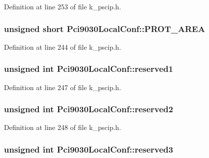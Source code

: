 Definition at line 253 of file k\_\-pscip.h.\hypertarget{struct_pci9030_local_conf_86e45b8c8a309f0710433c9752c94392}{
\subsubsection[{PROT\_\-AREA}]{\setlength{\rightskip}{0pt plus 5cm}unsigned short {\bf Pci9030LocalConf::PROT\_\-AREA}}}
\label{struct_pci9030_local_conf_86e45b8c8a309f0710433c9752c94392}




Definition at line 244 of file k\_\-pscip.h.\hypertarget{struct_pci9030_local_conf_334ab05104ad1d45a3170a45a2686871}{
\subsubsection[{reserved1}]{\setlength{\rightskip}{0pt plus 5cm}unsigned int {\bf Pci9030LocalConf::reserved1}}}
\label{struct_pci9030_local_conf_334ab05104ad1d45a3170a45a2686871}




Definition at line 247 of file k\_\-pscip.h.\hypertarget{struct_pci9030_local_conf_fd857d368f0aa6258819d7d9b09d12f0}{
\subsubsection[{reserved2}]{\setlength{\rightskip}{0pt plus 5cm}unsigned int {\bf Pci9030LocalConf::reserved2}}}
\label{struct_pci9030_local_conf_fd857d368f0aa6258819d7d9b09d12f0}




Definition at line 248 of file k\_\-pscip.h.\hypertarget{struct_pci9030_local_conf_a490a2efaeef3f76654abdfb4eb0d633}{
\subsubsection[{reserved3}]{\setlength{\rightskip}{0pt plus 5cm}unsigned int {\bf Pci9030LocalConf::reserved3}}}
\label{struct_pci9030_local_conf_a490a2efaeef3f76654abdfb4eb0d633}




